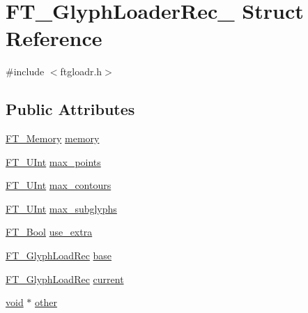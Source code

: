 \hypertarget{struct_f_t___glyph_loader_rec__}{\section{F\-T\-\_\-\-Glyph\-Loader\-Rec\-\_\- Struct Reference}
\label{struct_f_t___glyph_loader_rec__}
}


{\ttfamily \#include $<$ftgloadr.\-h$>$}

\subsection*{Public Attributes}
\begin{DoxyCompactItemize}
\item 
\hyperlink{ftsystem_8h_a67ec7ea35cde99a89a65e9f827a9ad3a}{F\-T\-\_\-\-Memory} \hyperlink{struct_f_t___glyph_loader_rec___a9120a7808ee59d24dd52409e609907a2}{memory}
\item 
\hyperlink{fttypes_8h_abcb8db4dbf35d2b55a9e8c7b0926dc52}{F\-T\-\_\-\-U\-Int} \hyperlink{struct_f_t___glyph_loader_rec___a62339fa7a06e0b4ddecd5db2aa606741}{max\-\_\-points}
\item 
\hyperlink{fttypes_8h_abcb8db4dbf35d2b55a9e8c7b0926dc52}{F\-T\-\_\-\-U\-Int} \hyperlink{struct_f_t___glyph_loader_rec___a808ccf46597572d953f387e705f10a36}{max\-\_\-contours}
\item 
\hyperlink{fttypes_8h_abcb8db4dbf35d2b55a9e8c7b0926dc52}{F\-T\-\_\-\-U\-Int} \hyperlink{struct_f_t___glyph_loader_rec___a2d5b00d7caf624ed2b4f6fd2db3228db}{max\-\_\-subglyphs}
\item 
\hyperlink{fttypes_8h_a1a832a256bb5a7e6e884afaa1a07f3ae}{F\-T\-\_\-\-Bool} \hyperlink{struct_f_t___glyph_loader_rec___a54009985acda32d83f2f124e28c5d00a}{use\-\_\-extra}
\item 
\hyperlink{ftgloadr_8h_a5a0b4cd6ce4edd88c6ed8b64d85362f6}{F\-T\-\_\-\-Glyph\-Load\-Rec} \hyperlink{struct_f_t___glyph_loader_rec___ae80dfc17f20bfce8c60ffaaba95c821b}{base}
\item 
\hyperlink{ftgloadr_8h_a5a0b4cd6ce4edd88c6ed8b64d85362f6}{F\-T\-\_\-\-Glyph\-Load\-Rec} \hyperlink{struct_f_t___glyph_loader_rec___a271b1b9604746ed08cf6613710ebb4c1}{current}
\item 
\hyperlink{wglew_8h_aeea6e3dfae3acf232096f57d2d57f084}{void} $\ast$ \hyperlink{struct_f_t___glyph_loader_rec___a9c58c5b06f0135fe5cef16bd85d939e3}{other}
\end{DoxyCompactItemize}


